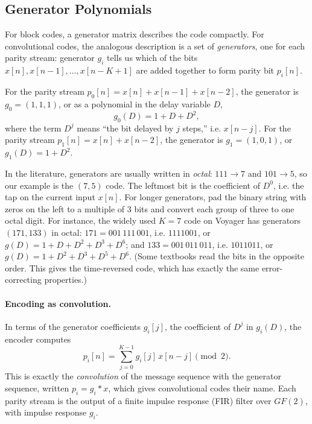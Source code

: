 \subsection{Generator Polynomials}
For block codes, a generator matrix describes the code compactly. For convolutional codes, the analogous description is a set of \emph{generators}, one for each parity stream: generator \(g_i\) tells us which of the bits \(x[n], x[n-1], \ldots, x[n-K+1]\) are added together to form parity bit \(p_i[n]\).

For the parity stream \(p_0[n] = x[n] + x[n-1] + x[n-2]\), the generator is \(g_0 = (1,1,1)\), or as a polynomial in the delay variable \(D\),
\[g_0(D) = 1 + D + D^2,\]
where the term \(D^j\) means ``the bit delayed by \(j\) steps,'' i.e. \(x[n-j]\). For the parity stream \(p_1[n] = x[n] + x[n-2]\), the generator is \(g_1 = (1,0,1)\), or \(g_1(D) = 1 + D^2\).

In the literature, generators are usually written in \emph{octal}: \(111 \to 7\) and \(101 \to 5\), so our example is the \((7,5)\) code. The leftmost bit is the coefficient of \(D^0\), i.e. the tap on the current input \(x[n]\). For longer generators, pad the binary string with zeros on the left to a multiple of \(3\) bits and convert each group of three to one octal digit. For instance, the widely used \(K = 7\) code on Voyager has generators \((171, 133)\) in octal: \(171 = 001\,111\,001\), i.e. \(1111001\), or \(g(D) = 1 + D + D^2 + D^3 + D^6\); and \(133 = 001\,011\,011\), i.e. \(1011011\), or \(g(D) = 1 + D^2 + D^3 + D^5 + D^6\). (Some textbooks read the bits in the opposite order. This gives the time-reversed code, which has exactly the same error-correcting properties.)

\paragraph{Encoding as convolution.} In terms of the generator coefficients \(g_i[j]\), the coefficient of \(D^j\) in \(g_i(D)\), the encoder computes
\[p_i[n] = \sum_{j=0}^{K-1} g_i[j]\, x[n-j] \pmod 2.\]
This is exactly the \emph{convolution} of the message sequence with the generator sequence, written \(p_i = g_i \ast x\), which gives convolutional codes their name. Each parity stream is the output of a finite impulse response (FIR) filter over \(GF(2)\), with impulse response \(g_i\).

